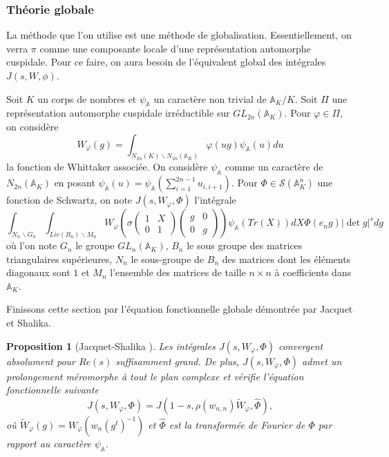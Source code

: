 \documentclass{amsart}
\newtheorem{proposition}{Proposition}[section]
\begin{document}
  \subsubsection{Théorie globale}
  La méthode que l'on utilise est une méthode de globalisation. Essentiellement, on verra $\pi$ comme une composante locale d'une représentation automorphe cuspidale. Pour ce faire, on aura besoin de l'équivalent global des intégrales $J(s, W, \phi)$.
  
  Soit $K$ un corps de nombres et $\psi_\mathbb{A}$ un caractère non trivial de $\mathbb{A}_K/K$. Soit $\Pi$ une représentation automorphe cuspidale irréductible sur $GL_{2n}(\mathbb{A}_K)$. Pour $\varphi \in \Pi$, on considère
  \begin{equation}
  W_\varphi(g) = \int_{N_{2n}(K)\backslash{N_{2n}(\mathbb{A}_K)}} \varphi(ug)\psi_\mathbb{A}(u)du
  \end{equation}
  la fonction de Whittaker associée. On considère $\psi_\mathbb{A}$ comme un caractère de $N_{2n}(\mathbb{A}_K)$ en posant $\psi_\mathbb{A}(u) = \psi_\mathbb{A}(\sum_{i=1}^{2n-1} u_{i,i+1})$. Pour $\Phi \in \mathcal{S}(\mathbb{A}_K^n)$ une fonction de Schwartz, on note $J(s, W_\varphi, \Phi)$ l'intégrale
  \begin{equation}
\int_{N_n\backslash{G_n}} \int_{Lie(B_n)\backslash{M_n}} W_\varphi \left(\sigma \begin{pmatrix}
1 & X \\
0 & 1
\end{pmatrix}\begin{pmatrix}
g & 0 \\
0 & g
\end{pmatrix}\right)\psi_\mathbb{A}(Tr(X))dX\Phi(e_ng)|\det g|^s dg
 \end{equation}
 où l'on note $G_n$ le groupe $GL_n(\mathbb{A}_K)$, $B_n$ le sous groupe des matrices triangulaires supérieures, $N_n$ le sous-groupe de $B_n$ des matrices dont les éléments diagonaux sont $1$ et $M_n$ l'ensemble des matrices de taille $n \times n$ à coefficients dans $\mathbb{A}_K$.
 
  Finissons cette section par l'équation fonctionnelle globale démontrée par Jacquet et Shalika.
 \begin{proposition}[Jacquet-Shalika \cite{jacquet-shalika}]
 \label{funcglob}
 Les intégrales $J(s, W_\varphi, \Phi)$ convergent absolument pour $Re(s)$ suffisamment grand. De plus, $J(s, W_\varphi, \Phi)$ admet un prolongement méromorphe à tout le plan complexe et vérifie l'équation fonctionnelle suivante
 \begin{equation}
 J(s,W_\varphi,\Phi)=J(1-s, \rho(w_{n,n})\tilde{W}_\varphi, \hat{\Phi}),
 \end{equation}
 où $\tilde{W}_\varphi(g) = W_\varphi(w_n(g^t)^{-1})$ et $\hat{\Phi}$ est la transformée de Fourier de $\Phi$ par rapport au caractère $\psi_\mathbb{A}$.
 \end{proposition}
 
\end{document}
